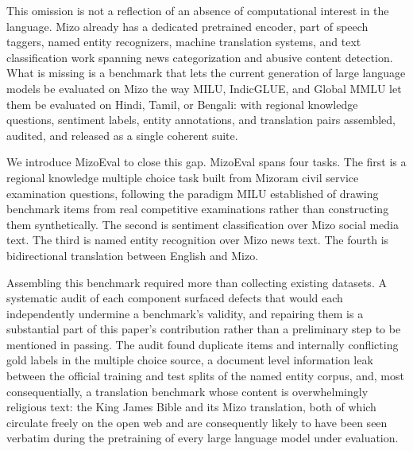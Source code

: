 \documentclass[11pt,a4paper]{article}
\begin{document}
This omission is not a reflection of an absence of computational interest in the language. Mizo already has a dedicated pretrained encoder, part of speech taggers, named entity recognizers, machine translation systems, and text classification work spanning news categorization and abusive content detection. What is missing is a benchmark that lets the current generation of large language models be evaluated on Mizo the way MILU, IndicGLUE, and Global MMLU let them be evaluated on Hindi, Tamil, or Bengali: with regional knowledge questions, sentiment labels, entity annotations, and translation pairs assembled, audited, and released as a single coherent suite.

We introduce MizoEval to close this gap. MizoEval spans four tasks. The first is a regional knowledge multiple choice task built from Mizoram civil service examination questions, following the paradigm MILU established of drawing benchmark items from real competitive examinations rather than constructing them synthetically. The second is sentiment classification over Mizo social media text. The third is named entity recognition over Mizo news text. The fourth is bidirectional translation between English and Mizo.

Assembling this benchmark required more than collecting existing datasets. A systematic audit of each component surfaced defects that would each independently undermine a benchmark's validity, and repairing them is a substantial part of this paper's contribution rather than a preliminary step to be mentioned in passing. The audit found duplicate items and internally conflicting gold labels in the multiple choice source, a document level information leak between the official training and test splits of the named entity corpus, and, most consequentially, a translation benchmark whose content is overwhelmingly religious text: the King James Bible and its Mizo translation, both of which circulate freely on the open web and are consequently likely to have been seen verbatim during the pretraining of every large language model under evaluation.
\end{document}
